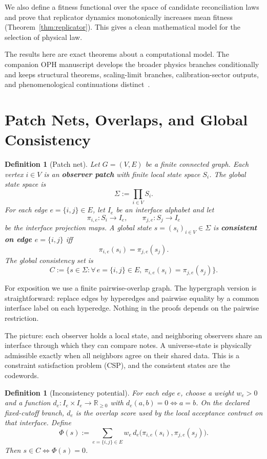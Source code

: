 \documentclass[11pt]{article}
\newtheorem{definition}[theorem]{Definition}
\theoremstyle{remark}
\theoremstyle{plain}
\begin{document}
We also define a fitness functional over the space of candidate reconciliation laws and prove that replicator dynamics monotonically increases mean fitness (Theorem~\ref{thm:replicator}). This gives a clean mathematical model for the selection of physical law.

The results here are exact theorems about a computational model. The companion OPH manuscript develops the broader physics branches conditionally and keeps structural theorems, scaling-limit branches, calibration-sector outputs, and phenomenological continuations distinct~\cite{OPH}.


\section{Patch Nets, Overlaps, and Global Consistency}

\begin{definition}[Patch net]\label{def:patchnet}
Let $G=(V,E)$ be a finite connected graph. Each vertex $i\in V$ is an \textbf{observer patch} with finite local state space $S_i$. The global state space is
\[
\Sigma := \prod_{i\in V} S_i.
\]
For each edge $e=\{i,j\}\in E$, let $I_e$ be an interface alphabet and let
\[
\pi_{i,e}:S_i\to I_e,
\qquad
\pi_{j,e}:S_j\to I_e
\]
be the interface projection maps. A global state $s=(s_i)_{i\in V}\in\Sigma$ is \textbf{consistent on edge $e=\{i,j\}$} iff
\[
\pi_{i,e}(s_i)=\pi_{j,e}(s_j).
\]
The global consistency set is
\[
C:=\bigl\{s\in\Sigma:\forall\, e=\{i,j\}\in E,\ \pi_{i,e}(s_i)=\pi_{j,e}(s_j)\bigr\}.
\]
\end{definition}

For exposition we use a finite pairwise-overlap graph. The hypergraph version is straightforward: replace edges by hyperedges and pairwise equality by a common interface label on each hyperedge. Nothing in the proofs depends on the pairwise restriction.

The picture: each observer holds a local state, and neighboring observers share an interface through which they can compare notes. A universe-state is physically admissible exactly when all neighbors agree on their shared data. This is a constraint satisfaction problem (CSP), and the consistent states are the codewords.

\begin{definition}[Inconsistency potential]\label{def:potential}
For each edge $e$, choose a weight $w_e>0$ and a function $d_e:I_e\times I_e\to\mathbb{R}_{\ge 0}$ with $d_e(a,b)=0 \iff a=b$. On the declared fixed-cutoff branch, \(d_e\) is the overlap score used by the local acceptance contract on that interface. Define
\[
\Phi(s)
:=
\sum_{e=\{i,j\}\in E}
w_e\, d_e\!\bigl(\pi_{i,e}(s_i),\pi_{j,e}(s_j)\bigr).
\]
Then $s\in C \iff \Phi(s)=0$.
\end{definition}
\end{document}

